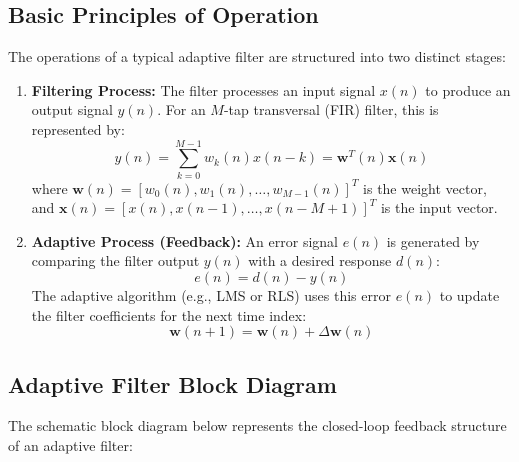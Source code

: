 \documentclass[12pt,a4paper]{article}
\begin{document}
\subsection{Basic Principles of Operation}
The operations of a typical adaptive filter are structured into two distinct stages:
\begin{enumerate}[label=\textbf{\arabic*.}, leftmargin=*, itemsep=3pt]
  \item \textbf{Filtering Process:} The filter processes an input signal $x(n)$ to produce an output signal $y(n)$. For an $M$-tap transversal (FIR) filter, this is represented by:
  \begin{equation}
    y(n) = \sum_{k=0}^{M-1} w_k(n) x(n-k) = \mathbf{w}^T(n) \mathbf{x}(n)
  \end{equation}
  where $\mathbf{w}(n) = [w_0(n), w_1(n), \dots, w_{M-1}(n)]^T$ is the weight vector, and $\mathbf{x}(n) = [x(n), x(n-1), \dots, x(n-M+1)]^T$ is the input vector.
  \item \textbf{Adaptive Process (Feedback):} An error signal $e(n)$ is generated by comparing the filter output $y(n)$ with a desired response $d(n)$:
  \begin{equation}
    e(n) = d(n) - y(n)
  \end{equation}
  The adaptive algorithm (e.g., LMS or RLS) uses this error $e(n)$ to update the filter coefficients for the next time index:
  \begin{equation}
    \mathbf{w}(n+1) = \mathbf{w}(n) + \Delta \mathbf{w}(n)
  \end{equation}
\end{enumerate}

\subsection{Adaptive Filter Block Diagram}
The schematic block diagram below represents the closed-loop feedback structure of an adaptive filter:
\end{document}

